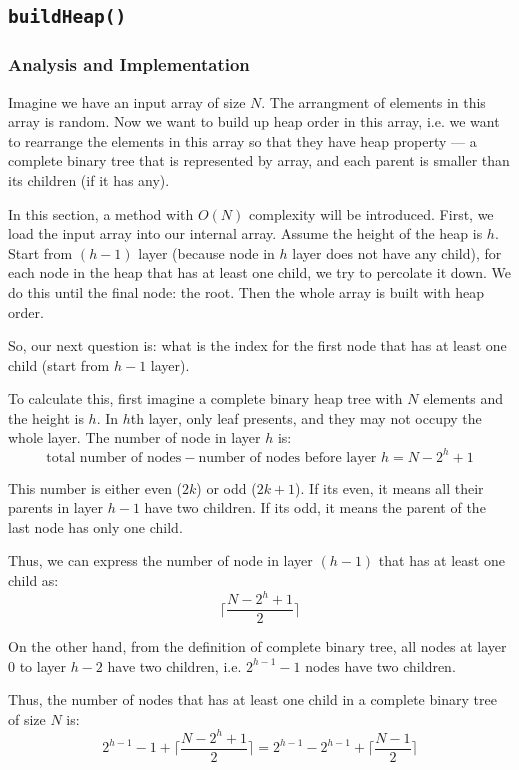 \documentclass[12pt]{book}
\begin{document}
\subsection{\texttt{buildHeap()}}
\label{sec:org6fdb8e9}
\subsubsection{Analysis and Implementation}
\label{sec:orgf888faf}
Imagine we have an input array of size \(N\). The arrangment of elements in this array is random. Now we want to build up heap order in this array, i.e. we want to rearrange the elements in this array so that they have heap property --- a complete binary tree that is represented by array, and each parent is smaller than its children (if it has any).

In this section, a method with \(O(N)\) complexity will be introduced. First, we load the input array into our internal array. Assume the height of the heap is \(h\). Start from \((h - 1)\) layer (because node in \(h\) layer does not have any child), for each node in the heap that has at least one child, we try to percolate it down. We do this until the final node: the root. Then the whole array is built with heap order.

So, our next question is: what is the index for the first node that has at least one child (start from \(h - 1\) layer).

To calculate this, first imagine a complete binary heap tree with \(N\) elements and the height is \(h\). In \(h\)th layer, only leaf presents, and they may not occupy the whole layer. The number of node in layer \(h\) is:
\[
\text {total number of nodes} - \text {number of nodes before layer } h = N - 2^h + 1
\]

This number is either even (\(2k\)) or odd (\(2k + 1\)). If its even, it means all their parents in layer \(h - 1\) have two children. If its odd, it means the parent of the last node has only one child.

Thus, we can express the number of node in layer \((h - 1)\) that has at least one child as:
\[
\lceil \frac {N - 2^h + 1} {2} \rceil
\]

On the other hand, from the definition of complete binary tree, all nodes at layer \(0\) to layer \(h - 2\) have two children, i.e. \(2^{h - 1} - 1\) nodes have two children.

Thus, the number of nodes that has at least one child in a complete binary tree of size \(N\) is:
\[
2^{h - 1} - 1 + \lceil \frac {N - 2^h + 1} {2} \rceil
= 2^{h - 1} - 2^{h - 1} + \lceil \frac {N - 1} {2} \rceil
\]
\end{document}
